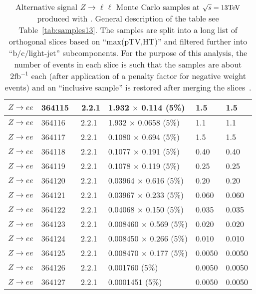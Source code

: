 \begin{table}[htbp]
\begin{center}
\begin{tabular}{l|l|l|l|l|l}
    			$ Z \to ee $ & 364115 & \Sherpa\ 2.2.1 & 1.932 $\times$ 0.114 (5\%)  & 1.5 & 1.5 \\\hline
    			$ Z \to ee $ & 364116 & \Sherpa\ 2.2.1 & 1.932 $\times$ 0.0658 (5\%)  & 1.1 & 1.1 \\\hline
    			$ Z \to ee $ & 364117 & \Sherpa\ 2.2.1 & 0.1080 $\times$ 0.694 (5\%)  & 1.5 & 1.5 \\\hline
    			$ Z \to ee $ & 364118 & \Sherpa\ 2.2.1 & 0.1077 $\times$ 0.191 (5\%)  & 0.40 & 0.40 \\\hline
    			$ Z \to ee $ & 364119 & \Sherpa\ 2.2.1 & 0.1078 $\times$ 0.119 (5\%)  & 0.25 & 0.25 \\\hline
    			$ Z \to ee $ & 364120 & \Sherpa\ 2.2.1 & 0.03964 $\times$ 0.616 (5\%)  & 0.20 & 0.20 \\\hline
    			$ Z \to ee $ & 364121 & \Sherpa\ 2.2.1 & 0.03967 $\times$ 0.233 (5\%)  & 0.060 & 0.060 \\\hline
    			$ Z \to ee $ & 364122 & \Sherpa\ 2.2.1 & 0.04068 $\times$ 0.150 (5\%)  & 0.035 & 0.035 \\\hline
    			$ Z \to ee $ & 364123 & \Sherpa\ 2.2.1 & 0.008460 $\times$ 0.569 (5\%)  & 0.020 & 0.020 \\\hline
    			$ Z \to ee $ & 364124 & \Sherpa\ 2.2.1 & 0.008450 $\times$ 0.266 (5\%)  & 0.010 & 0.010 \\\hline
    			$ Z \to ee $ & 364125 & \Sherpa\ 2.2.1 & 0.008470 $\times$ 0.177 (5\%)  & 0.0050 & 0.0050 \\\hline
    			$ Z \to ee $ & 364126 & \Sherpa\ 2.2.1 & 0.001760 (5\%)  & 0.0050 & 0.0050 \\\hline
    			$ Z \to ee $ & 364127 & \Sherpa\ 2.2.1 & 0.0001451 (5\%)  & 0.0050 & 0.0050 \\\hline
    		\end{tabular}
    		\caption{Alternative signal $Z\to\ell\ell$ Monte Carlo samples at
    			$\sqrt{s} = 13\text{Te\kern -0.1em V}$ produced with \Sherpa. General description of the table see
    			Table~\ref{tab:samples13}. The samples are split
    			into a long list of orthogonal slices based on ``max(pTV,HT)''
    			and filtered further into ``b/c/light-jet'' subcomponents. For
    			the purpose of this analysis, the number of events in each slice
    			is such that the samples are about $2\mathrm{fb}^{-1}$ each (after application
    			of a penalty factor for negative weight events) and
    			an ``inclusive sample'' is restored after merging the slices~\cite{int_note_samples}.}
    		\label{tab:samples13_sherpaz}
    	\end{center}
    \end{table}
    
